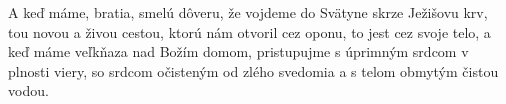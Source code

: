 A keď máme, bratia, smelú dôveru, že vojdeme do Svätyne skrze Ježišovu krv,
tou novou a živou cestou, ktorú nám otvoril cez oponu, to jest cez svoje telo,
a keď máme veľkňaza nad Božím domom,
pristupujme s úprimným srdcom v plnosti viery, so srdcom očisteným od zlého svedomia a s telom obmytým čistou vodou. 